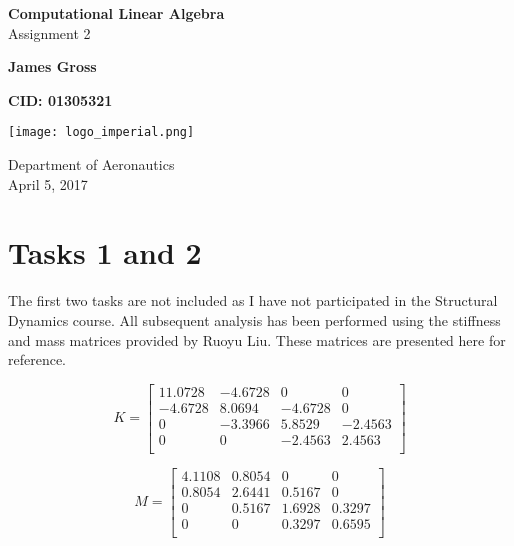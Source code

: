 \documentclass[11pt,oneside]{article}
\begin{document}
\begin{titlepage}
    \begin{center}
        \vspace*{1cm}
        \huge
        \textbf{Computational Linear Algebra}
        \\
        \vspace{0.5cm}
        \large
        Assignment 2
        
        \vspace{1.5cm}
        \LARGE
        \textbf{James Gross} 
        
        \vspace{0.5cm}
        \textbf{CID: 01305321}
        
        \vfill
        
        \vspace{0.8cm}
        
        \texttt{[image: logo\_imperial.png]}
        
        Department of Aeronautics\\
        April 5, 2017
        
    \end{center}
\end{titlepage}

\setcounter{page}{1}

\section*{Tasks 1 and 2}

The first two tasks are not included as I have not participated in the Structural Dynamics course. All subsequent analysis has been performed using the stiffness and mass matrices provided by Ruoyu Liu. These matrices are presented here for reference.

\begin{equation}
K = 
	\begin{bmatrix}
       	11.0728 & -4.6728 & 0 & 0   			\\[0.3em]
       	-4.6728 & 8.0694 & -4.6728 & 0       \\[0.3em]
      	0 & -3.3966 & 5.8529 & -2.4563		\\[0.3em]
		0 & 0 & -2.4563 & 2.4563			  	\\[0.3em]
  \end{bmatrix}
\end{equation}

\begin{equation}
M = 
	\begin{bmatrix}
       	4.1108 & 0.8054 & 0 & 0   			\\[0.3em]
       	0.8054 & 2.6441 & 0.5167 & 0       	\\[0.3em]
      	0 & 0.5167 & 1.6928 & 0.3297			\\[0.3em]
		0 & 0 & 0.3297 & 0.6595			  	\\[0.3em]
  \end{bmatrix}
\end{equation}
\end{document}
